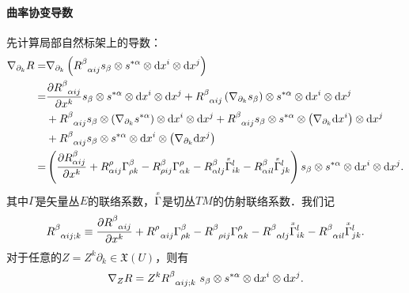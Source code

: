 \paragraph{曲率协变导数} 先计算局部自然标架上的导数：
\begin{align*}
	\nabla_{\partial_k} R = & \nabla_{\partial_k}\left(	R_{\hphantom{\alpha}\alpha i j}^\beta 
	s_\beta \otimes s^{*\alpha}\otimes {\rm d}x^i \otimes {\rm d}x^j \right) \\
	=& \frac{\partial R_{\hphantom{\alpha}\alpha i j}^\beta }{\partial x^k}
	s_\beta \otimes s^{*\alpha}\otimes {\rm d}x^i \otimes {\rm d}x^j 
	+ R_{\hphantom{\alpha}\alpha i j}^\beta \left( \nabla_{\partial_k} s_\beta \right)
	\otimes s^{*\alpha}\otimes {\rm d}x^i \otimes {\rm d}x^j \\
	& + R_{\hphantom{\alpha}\alpha i j}^\beta s_\beta \otimes 
	\left( \nabla_{\partial_k} s^{*\alpha} \right) \otimes {\rm d}x^i \otimes {\rm d}x^j 
	+ R_{\hphantom{\alpha}\alpha i j}^\beta s_\beta \otimes s^{*\alpha}\otimes  
	\left( \nabla_{\partial_k} {\rm d}x^i \right) \otimes  {\rm d}x^j \\
	&+ R_{\hphantom{\alpha}\alpha i j}^\beta s_\beta \otimes s^{*\alpha}\otimes {\rm d}x^i 
	\otimes \left( \nabla_{\partial_k} {\rm d}x^j \right) \\
	=&\left( \frac{\partial R_{\alpha i j}^\beta }{\partial x^k}
	+ R_{\alpha i j}^\rho \Gamma^\beta_{\rho k}
	- R_{\rho i j}^\beta \Gamma^\rho_{\alpha k}
	- R_{\alpha l j}^\beta \oversetmy{x}{\Gamma}^l_{i k}
	- R_{\alpha i l}^\beta \oversetmy{x}{\Gamma}^l_{j k}	\right)
	s_\beta \otimes s^{*\alpha}\otimes {\rm d}x^i \otimes {\rm d}x^j .
\end{align*}   %
其中$\Gamma$是矢量丛$E$的联络系数，$\oversetmy{x}{\Gamma}$是切丛$TM$的仿射联络系数．我们记
\begin{equation}\label{chfb:eqn_RijDk}
	 R_{\hphantom{\alpha}\alpha i j ; k}^\beta \equiv 
	\frac{\partial R_{\hphantom{\alpha}\alpha i j}^\beta }{\partial x^k}
	+ R_{\hphantom{\alpha}\alpha i j}^\rho \Gamma^\beta_{\rho k}
	- R_{\hphantom{\alpha}\rho i j}^\beta \Gamma^\rho_{\alpha k}
	- R_{\hphantom{\alpha}\alpha l j}^\beta \oversetmy{x}{\Gamma}^l_{i k}
	- R_{\hphantom{\alpha}\alpha i l}^\beta \oversetmy{x}{\Gamma}^l_{j k} .
\end{equation}
对于任意的$ Z = Z^k \partial_k \in \mathfrak{X}(U)$，则有
\begin{equation}\label{chfb:eqn_DZR}
	\nabla_{Z} R = Z^k R_{\hphantom{\alpha}\alpha i j ; k}^\beta \ 
	s_\beta \otimes s^{*\alpha}\otimes {\rm d}x^i \otimes {\rm d}x^j .
\end{equation}


